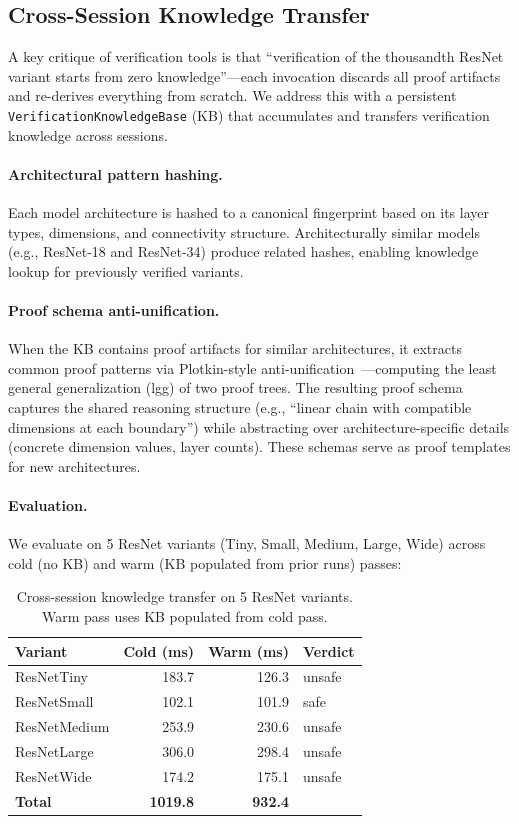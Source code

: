 \documentclass[11pt]{article}
\begin{document}
\subsection{Cross-Session Knowledge Transfer}\label{sec:cross-session}

A key critique of verification tools is that ``verification of the
thousandth ResNet variant starts from zero knowledge''---each
invocation discards all proof artifacts and re-derives everything
from scratch.  We address this with a persistent
\texttt{VerificationKnowledgeBase} (KB) that accumulates and
transfers verification knowledge across sessions.

\paragraph{Architectural pattern hashing.}
Each model architecture is hashed to a canonical fingerprint based on
its layer types, dimensions, and connectivity structure.
Architecturally similar models (e.g., ResNet-18 and ResNet-34)
produce related hashes, enabling knowledge lookup for previously
verified variants.

\paragraph{Proof schema anti-unification.}
When the KB contains proof artifacts for similar architectures,
it extracts common proof patterns via Plotkin-style
anti-unification~\cite{plotkin70}---computing the least general
generalization (lgg) of two proof trees.  The resulting proof
schema captures the shared reasoning structure (e.g., ``linear
chain with compatible dimensions at each boundary'') while
abstracting over architecture-specific details (concrete dimension
values, layer counts).  These schemas serve as proof templates
for new architectures.

\paragraph{Evaluation.}
We evaluate on 5 ResNet variants (Tiny, Small, Medium, Large, Wide)
across cold (no KB) and warm (KB populated from prior runs) passes:

\begin{table}[h]
\centering
\caption{Cross-session knowledge transfer on 5 ResNet variants.
  Warm pass uses KB populated from cold pass.}
\label{tab:cross-session}
\small
\begin{tabular}{@{}lrrl@{}}
\toprule
\textbf{Variant} & \textbf{Cold (ms)} & \textbf{Warm (ms)} & \textbf{Verdict} \\
\midrule
ResNetTiny   & 183.7 & 126.3 & unsafe \\
ResNetSmall  & 102.1 & 101.9 & safe \\
ResNetMedium & 253.9 & 230.6 & unsafe \\
ResNetLarge  & 306.0 & 298.4 & unsafe \\
ResNetWide   & 174.2 & 175.1 & unsafe \\
\midrule
\textbf{Total} & \textbf{1019.8} & \textbf{932.4} & \\
\bottomrule
\end{tabular}
\end{table}
\end{document}
